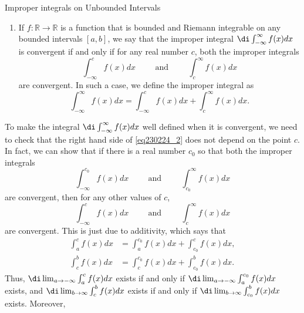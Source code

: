 \begin{example}[label=20230527]{}
\begin{definition}{Improper integrals on Unbounded Intervals}
\begin{enumerate}[1.]
If $f:(-\infty,b]\to\mathbb{R}$ is a   function that is bounded and Riemann integrable on any bounded intervals $[a, b]$, we say that the improper integral $\di\int^b_{-\infty}f(x)dx$ is convergent if the limit
\[\lim_{a\to-\infty}\int_a^{b}f(x)dx\] exists. Otherwise, we say that the improper integral is divergent.
If the improper integral is convergent, we define its value as   
\[\int^b_{-\infty}f(x)dx=\lim_{a\to-\infty}\int_a^{b}f(x)dx.\]
\item If $f:\mathbb{R}\to\mathbb{R}$ is a function that is bounded and Riemann integrable on any bounded intervals $[a,b]$, we say that the improper integral $\di\int_{-\infty}^{\infty}f(x)dx$ is convergent if and only if for any  real number $c$, both the improper integrals 
\[\int_{-\infty}^{c}f(x)dx\hspace{1cm}\text{and}\hspace{1cm}\int_{c}^{\infty}f(x)dx\] are convergent. In such a case, we define the improper integral as
\begin{equation}\label{eq230224_2}\int_{-\infty}^{\infty}f(x)dx=\int_{-\infty}^cf(x)dx+\int_c^{\infty}f(x)dx.\end{equation}
\end{enumerate}
\end{definition}
\begin{remark}{}
 To make the integral $\di\int_{-\infty}^{\infty}f(x)dx$ well defined when it is convergent, we need to check that the right hand side of \eqref{eq230224_2} does not depend on the point $c$. 
In fact, we can show that if there is a real number $c_0$ so that both the improper integrals 
\[\int_{-\infty}^{c_0}f(x)dx\hspace{1cm}\text{and}\hspace{1cm}\int_{c_0}^{\infty}f(x)dx\] are convergent,  then for any other values of $c$, \[\int_{-\infty}^{c}f(x)dx\hspace{1cm}\text{and}\hspace{1cm}\int_{c}^{\infty}f(x)dx\] are convergent. This is just due to additivity, which says that
\begin{align*}\int_a^cf(x)dx&=\int_a^{c_0}f(x)dx+\int_{c_0}^cf(x)dx,\\
\int_c^bf(x)dx&=\int_{c}^{c_0}f(x)dx+\int_{c_0}^bf(x)dx.\end{align*}
Thus, $\di\lim_{a\to-\infty}\int_a^cf(x)dx$ exists if and only if $\di\lim_{a\to-\infty}\int_a^{c_0}f(x)dx$ exists, and 
$\di\lim_{b\to\infty}\int_c^bf(x)dx$ exists if and only if 
$\di\lim_{b\to \infty}\int_{c_0}^{b}f(x)dx$ exists. Moreover,

\end{remark}
\end{example}
